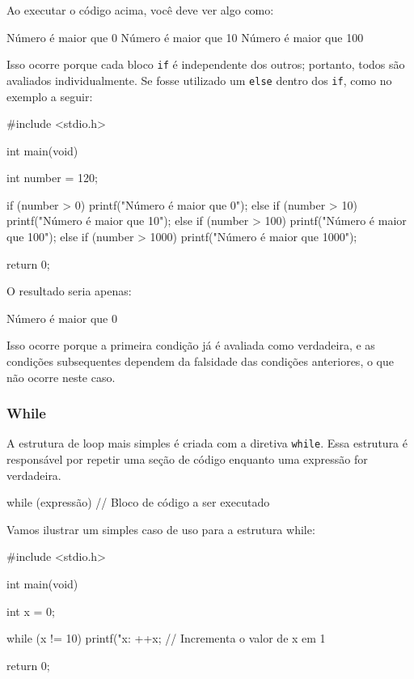 Ao executar o código acima, você deve ver algo como:

\begin{textbox}
    Número é maior que 0
    Número é maior que 10
    Número é maior que 100
\end{textbox}

Isso ocorre porque cada bloco \texttt{if} é independente dos outros; portanto, todos são avaliados individualmente. Se fosse utilizado um \texttt{else} dentro dos \texttt{if}, como no exemplo a seguir:

\newpage
\begin{excode}
    #include <stdio.h>

    int main(void)
    {
        int number = 120;

        if (number > 0) {
            printf("Número é maior que 0\n");
        } else if (number > 10) {
            printf("Número é maior que 10\n");
        } else if (number > 100) {
            printf("Número é maior que 100\n");
        } else if (number > 1000) {
            printf("Número é maior que 1000\n");
        }

        return 0;
    }
\end{excode}

O resultado seria apenas:

\begin{textbox}
    Número é maior que 0
\end{textbox}

Isso ocorre porque a primeira condição já é avaliada como verdadeira, e as 
condições subsequentes dependem da falsidade das condições anteriores, o que 
não ocorre neste caso.

\subsubsection{While}

A estrutura de loop mais simples é criada com a diretiva \texttt{while}. Essa 
estrutura é responsável por repetir uma seção de código enquanto uma expressão 
for verdadeira.

\begin{excode}
    while (expressão) {
        // Bloco de código a ser executado
    }
\end{excode}

Vamos ilustrar um simples caso de uso para a estrutura while:

\newpage
\begin{excode}
    #include <stdio.h>

    int main(void)
    {
        int x = 0;

        while (x != 10) {
            printf("x: %
            ++x; // Incrementa o valor de x em 1
        }

        return 0;
    }
\end{excode}

